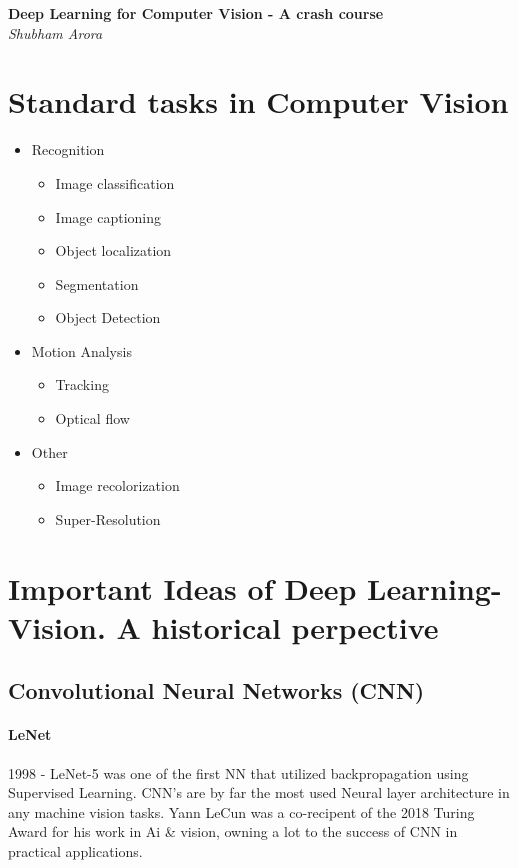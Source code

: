 \documentclass{article}
\begin{document}
	\begin{titlepage}
		\begin{center}
			\Large\textbf{Deep Learning for Computer Vision - A crash course}\\
			\large\textit{Shubham Arora}
		\end{center}
	\end{titlepage}

	\tableofcontents
	\newpage
	
	\section{Standard tasks in Computer Vision}
	\begin{itemize}
		\item Recognition
		\begin{itemize}
			\item Image classification
			\item Image captioning
			\item Object localization
			\item Segmentation
			\item Object Detection
		\end{itemize}
		\item Motion Analysis
		\begin{itemize}
			\item Tracking
			\item Optical flow
		\end{itemize}
		\item Other
		\begin{itemize}
			\item Image recolorization
			\item Super-Resolution
		\end{itemize}
	
	\end{itemize}
	\section{Important Ideas of Deep Learning-Vision. A historical perpective}
	
	\subsection{Convolutional Neural Networks (CNN)}
		\paragraph{LeNet}
			1998 - LeNet-5 was one of the first NN that utilized backpropagation using Supervised Learning. CNN's are by far the most used Neural layer architecture in any machine vision tasks. Yann LeCun was a co-recipent of the 2018 Turing Award for his work in Ai \& vision, owning a lot to the success of CNN in practical applications.
			
\end{document}
